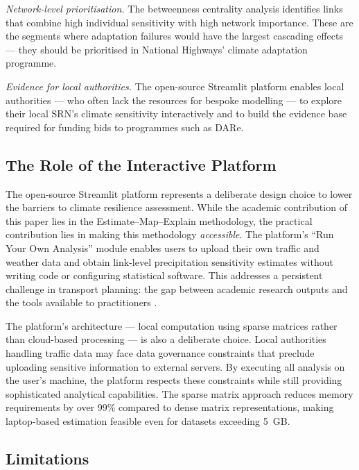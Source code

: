 \documentclass[review]{elsarticle}
\begin{document}
\textit{Network-level prioritisation.} The betweenness centrality analysis identifies links that combine high individual sensitivity with high network importance. These are the segments where adaptation failures would have the largest cascading effects --- they should be prioritised in National Highways' climate adaptation programme.

\textit{Evidence for local authorities.} The open-source Streamlit platform enables local authorities --- who often lack the resources for bespoke modelling --- to explore their local SRN's climate sensitivity interactively and to build the evidence base required for funding bids to programmes such as DARe.

\subsection{The Role of the Interactive Platform}
\label{sec:disc:platform}

The open-source Streamlit platform represents a deliberate design choice to lower the barriers to climate resilience assessment. While the academic contribution of this paper lies in the Estimate--Map--Explain methodology, the practical contribution lies in making this methodology \textit{accessible}. The platform's ``Run Your Own Analysis'' module enables users to upload their own traffic and weather data and obtain link-level precipitation sensitivity estimates without writing code or configuring statistical software. This addresses a persistent challenge in transport planning: the gap between academic research outputs and the tools available to practitioners \citep{unece2024stress}.

The platform's architecture --- local computation using sparse matrices rather than cloud-based processing --- is also a deliberate choice. Local authorities handling traffic data may face data governance constraints that preclude uploading sensitive information to external servers. By executing all analysis on the user's machine, the platform respects these constraints while still providing sophisticated analytical capabilities. The sparse matrix approach reduces memory requirements by over 99\% compared to dense matrix representations, making laptop-based estimation feasible even for datasets exceeding 5~GB.

\subsection{Limitations}
\label{sec:disc:limits}
\end{document}
